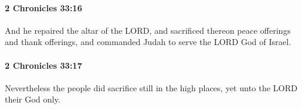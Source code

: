 		\paragraph{2 Chronicles 33:16} %
			\label{2CHRONICLES-33-16}

			And he repaired the altar of the LORD, and sacrificed thereon peace offerings and thank offerings, and commanded Judah to serve the LORD God of Israel.


		\paragraph{2 Chronicles 33:17} %
			\label{2CHRONICLES-33-17}

			Nevertheless the people did sacrifice still in the high places, yet unto the LORD their God only.


